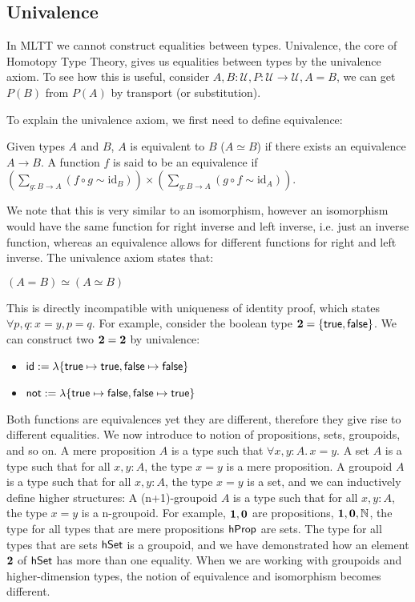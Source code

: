 \subsection{Univalence}\label{types:univalence}
In MLTT we cannot construct equalities between types. Univalence, the core of Homotopy Type Theory,
gives us equalities between types by the univalence axiom. To see how this is useful,
consider $A, B : \mathcal{U}, P : \mathcal{U} \rightarrow \mathcal{U}, A = B$, we can
get $P(B)$ from $P(A)$ by transport (or substitution).

To explain the univalence axiom, we first need to define equivalence:
\begin{definition}
      Given types $A$ and $B$, $A$ is equivalent to $B$ ($A \simeq B$) if there exists an
  equivalence $A \rightarrow B$.
  A function $f$ is said to be an equivalence if
  $\left( \sum_{g :B \rightarrow A} (f \circ g \sim \mathrm{id}_B) \right) \times \left( \sum_{g:B \rightarrow A} (g \circ f \sim \mathrm{id}_A) \right)$.
\end{definition}

We note that this is very similar to an isomorphism, however an isomorphism would have the same function
for right inverse and left inverse, i.e. just an inverse function, whereas an equivalence allows
for different functions for right and left inverse. The univalence axiom states that:
\begin{definition}
     $(A = B) \simeq (A \simeq B)$
\end{definition}

This is directly incompatible with uniqueness of identity proof, which states
$\forall p, q: x = y, p = q$. For example, consider the boolean type
${\mathbf{2}} = \{\operatorname{\mathsf{true}}, \operatorname{\mathsf{false}}\}$. We can construct two ${\mathbf{2}} = {\mathbf{2}}$
by univalence:
\begin{itemize}
    \item $\operatorname{\mathsf{id}} := \lambda \{ \operatorname{\mathsf{true}} \mapsto \operatorname{\mathsf{true}}, \operatorname{\mathsf{false}} \mapsto \operatorname{\mathsf{false}} \}$
    \item $\operatorname{\mathsf{not}} := \lambda \{ \operatorname{\mathsf{true}} \mapsto \operatorname{\mathsf{false}}, \operatorname{\mathsf{false}} \mapsto \operatorname{\mathsf{true}} \}$
\end{itemize}

Both functions are equivalences yet they are different, therefore they give rise to different equalities.
We now introduce to notion of propositions, sets, groupoids, and so on.
A mere proposition $A$ is a type such that $\forall x, y : A.\, x = y$.
A set $A$ is a type such that for all $x, y : A$, the type $x = y$ is a mere proposition.
A groupoid $A$ is a type such that for all $x, y : A$, the type $x = y$ is a set,
and we can inductively define higher structures:
A (n+1)-groupoid $A$ is a type such that for all $x, y : A$, the type $x = y$ is a n-groupoid.
For example, ${\mathbf{1}}, {\mathbf{0}}$ are propositions, ${\mathbf{1}}, {\mathbf{0}}, \mathbb{N}$,
the type for all types that are mere propositions $\mathsf{hProp}$ are sets.
The type for all types that are sets $\mathsf{hSet}$ is a groupoid, and we have demonstrated how an element ${\mathbf{2}}$
of $\mathsf{hSet}$ has more than one equality. When we are working with groupoids and higher-dimension
types, the notion of equivalence and isomorphism becomes different.

